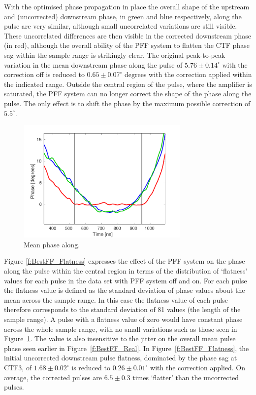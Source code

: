 With the optimised phase propagation in place the overall shape of the upstream and 
(uncorrected) downstream phase, in green and blue respectively, along the pulse are very 
similar, although small uncorrelated variations are still visible. These uncorrelated 
differences are then visible in the corrected downstream phase (in red), although the 
overall ability of the PFF system to flatten the CTF phase sag within the sample range 
is strikingly clear. The original peak-to-peak variation in the mean downstream phase 
along the pulse of \(5.76\pm0.14^\circ\) with the correction off is reduced to 
\(0.65\pm0.07^\circ\) degrees with the correction applied within the indicated range. 
Outside the central region of the pulse, where the amplifier is saturated, the PFF 
system can no longer correct the shape of the phase along the pulse. The only effect is 
to shift the phase by the maximum possible correction of \(5.5^\circ\).


\begin{figure}
  \centering
  \includegraphics[width=0.75\textwidth]{Figures/feedforward/BestFF_MeanPhaseAlong}
  \caption{Mean phase along.}
  \label{f:BestFF_MeanPhaseAlong}
\end{figure}

Figure \ref{f:BestFF_Flatness} expresses the effect of the PFF system on the phase along 
the pulse within the central region in terms of the distribution of `flatness' values 
for each pulse in the data set with PFF system off and on. For each pulse the flatness 
value is defined as the standard deviation of phase values about the mean across the 
sample range. In this case the flatness value of each pulse therefore corresponds to 
the standard deviation of 81 values (the length of the sample range). A pulse with a 
flatness value of zero would have constant phase across the whole sample range, with no 
small variations such as those seen in Figure~\ref{f:BestFF_MeanPhaseAlong}. The value 
is also insensitive to the jitter on the overall mean pulse phase seen earlier in Figure~\ref{f:BestFF_Real}. 
In Figure~\ref{f:BestFF_Flatness}, the initial uncorrected 
downstream pulse flatness, dominated by the phase sag at CTF3, of \(1.68\pm0.02^\circ\) 
is reduced to \(0.26\pm0.01^\circ\) with the correction applied. On average, the 
corrected pulses are \(6.5\pm0.3\) times `flatter' than the uncorrected pulses.


